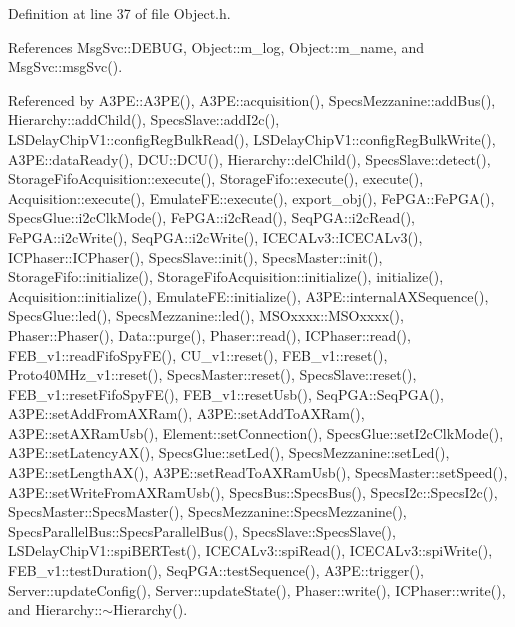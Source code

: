 Definition at line 37 of file Object.\+h.



References Msg\+Svc\+::\+D\+E\+B\+UG, Object\+::m\+\_\+log, Object\+::m\+\_\+name, and Msg\+Svc\+::msg\+Svc().



Referenced by A3\+P\+E\+::\+A3\+P\+E(), A3\+P\+E\+::acquisition(), Specs\+Mezzanine\+::add\+Bus(), Hierarchy\+::add\+Child(), Specs\+Slave\+::add\+I2c(), L\+S\+Delay\+Chip\+V1\+::config\+Reg\+Bulk\+Read(), L\+S\+Delay\+Chip\+V1\+::config\+Reg\+Bulk\+Write(), A3\+P\+E\+::data\+Ready(), D\+C\+U\+::\+D\+C\+U(), Hierarchy\+::del\+Child(), Specs\+Slave\+::detect(), Storage\+Fifo\+Acquisition\+::execute(), Storage\+Fifo\+::execute(), execute(), Acquisition\+::execute(), Emulate\+F\+E\+::execute(), export\+\_\+obj(), Fe\+P\+G\+A\+::\+Fe\+P\+G\+A(), Specs\+Glue\+::i2c\+Clk\+Mode(), Fe\+P\+G\+A\+::i2c\+Read(), Seq\+P\+G\+A\+::i2c\+Read(), Fe\+P\+G\+A\+::i2c\+Write(), Seq\+P\+G\+A\+::i2c\+Write(), I\+C\+E\+C\+A\+Lv3\+::\+I\+C\+E\+C\+A\+Lv3(), I\+C\+Phaser\+::\+I\+C\+Phaser(), Specs\+Slave\+::init(), Specs\+Master\+::init(), Storage\+Fifo\+::initialize(), Storage\+Fifo\+Acquisition\+::initialize(), initialize(), Acquisition\+::initialize(), Emulate\+F\+E\+::initialize(), A3\+P\+E\+::internal\+A\+X\+Sequence(), Specs\+Glue\+::led(), Specs\+Mezzanine\+::led(), M\+S\+Oxxxx\+::\+M\+S\+Oxxxx(), Phaser\+::\+Phaser(), Data\+::purge(), Phaser\+::read(), I\+C\+Phaser\+::read(), F\+E\+B\+\_\+v1\+::read\+Fifo\+Spy\+F\+E(), C\+U\+\_\+v1\+::reset(), F\+E\+B\+\_\+v1\+::reset(), Proto40\+M\+Hz\+\_\+v1\+::reset(), Specs\+Master\+::reset(), Specs\+Slave\+::reset(), F\+E\+B\+\_\+v1\+::reset\+Fifo\+Spy\+F\+E(), F\+E\+B\+\_\+v1\+::reset\+Usb(), Seq\+P\+G\+A\+::\+Seq\+P\+G\+A(), A3\+P\+E\+::set\+Add\+From\+A\+X\+Ram(), A3\+P\+E\+::set\+Add\+To\+A\+X\+Ram(), A3\+P\+E\+::set\+A\+X\+Ram\+Usb(), Element\+::set\+Connection(), Specs\+Glue\+::set\+I2c\+Clk\+Mode(), A3\+P\+E\+::set\+Latency\+A\+X(), Specs\+Glue\+::set\+Led(), Specs\+Mezzanine\+::set\+Led(), A3\+P\+E\+::set\+Length\+A\+X(), A3\+P\+E\+::set\+Read\+To\+A\+X\+Ram\+Usb(), Specs\+Master\+::set\+Speed(), A3\+P\+E\+::set\+Write\+From\+A\+X\+Ram\+Usb(), Specs\+Bus\+::\+Specs\+Bus(), Specs\+I2c\+::\+Specs\+I2c(), Specs\+Master\+::\+Specs\+Master(), Specs\+Mezzanine\+::\+Specs\+Mezzanine(), Specs\+Parallel\+Bus\+::\+Specs\+Parallel\+Bus(), Specs\+Slave\+::\+Specs\+Slave(), L\+S\+Delay\+Chip\+V1\+::spi\+B\+E\+R\+Test(), I\+C\+E\+C\+A\+Lv3\+::spi\+Read(), I\+C\+E\+C\+A\+Lv3\+::spi\+Write(), F\+E\+B\+\_\+v1\+::test\+Duration(), Seq\+P\+G\+A\+::test\+Sequence(), A3\+P\+E\+::trigger(), Server\+::update\+Config(), Server\+::update\+State(), Phaser\+::write(), I\+C\+Phaser\+::write(), and Hierarchy\+::$\sim$\+Hierarchy().


